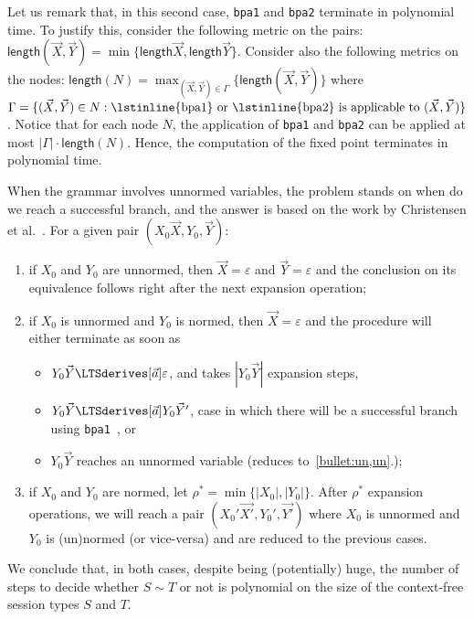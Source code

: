 Let us remark that, in this second case, \lstinline{bpa1} and 
\lstinline{bpa2} terminate in polynomial time. 
To justify this, consider the following
metric on the pairs: $\mathsf{length}(\vec X, \vec Y) = 
\min \{\mathsf{length} \vec X, \mathsf{length} \vec Y\}.$ 
Consider also the following metrics on the nodes:
$\mathsf{length}(N) = \max_{(\vec X, \vec Y)\in \Gamma} 
\{\mathsf{length}(\vec X, \vec Y)\}$
where $\Gamma=\{(\vec X,\vec Y)\in N : \text{\lstinline{bpa1} or  
\lstinline{bpa2} is applicable to }(\vec X,\vec Y) \}$. 
Notice that for each node $N$, the application
of \lstinline{bpa1} and \lstinline{bpa2} can be applied at most
$|\Gamma|\cdot\mathsf{length}(N)$. Hence, the computation
of the fixed point terminates in polynomial time. 
 
When the grammar involves unnormed variables, the problem
stands on when do we reach a successful branch, and the
answer is based on the work by Christensen et 
al.~\cite{DBLP:journals/iandc/ChristensenHS95}.
For a given pair $(X_0\vec X, Y_0,\vec Y)$:
\begin{enumerate}
	\item \label{bullet:un,un}  if $X_0$ and $Y_0$ are unnormed, then 
		  $\vec X = \varepsilon$
		  and $\vec Y = \varepsilon$ and the conclusion on its equivalence
		  follows right after the next expansion operation;
	\item if $X_0$ is unnormed and $Y_0$ is normed, then $\vec X = \varepsilon$
		  and the procedure will either terminate as soon as
		  \begin{itemize}
		  	\item $Y_0\vec Y\LTSderives[\vec a] \varepsilon$, and takes 
		  		  $|Y_0\vec Y|$ expansion steps,
		  	\item $Y_0\vec Y\LTSderives[\vec a] Y_0\vec Y'$, case in which
		  		  there will be a successful branch using 
		  		  \lstinline{bpa1}~\cite{DBLP:journals/iandc/ChristensenHS95}, or
		  	\item $Y_0\vec Y$ reaches an unnormed variable 
		  		  (reduces to~\ref{bullet:un,un}.);
		  \end{itemize}
	\item if $X_0$ and $Y_0$ are normed, let 
		  $\rho^* = \min \{|X_0|, |Y_0|\}$. After $\rho^*$ expansion
		  operations, we will reach a pair $(X_0'\vec{X'}, Y_0',\vec{Y'})$
		  where $X_0$ is unnormed and $Y_0$ is (un)normed (or vice-versa)
		  and are reduced to the previous cases.
\end{enumerate}

We conclude that, in both cases, despite being (potentially) huge, the
number of steps to decide whether $S\sim T$ or not is polynomial on 
the size of the context-free session types $S$ and $T$.


